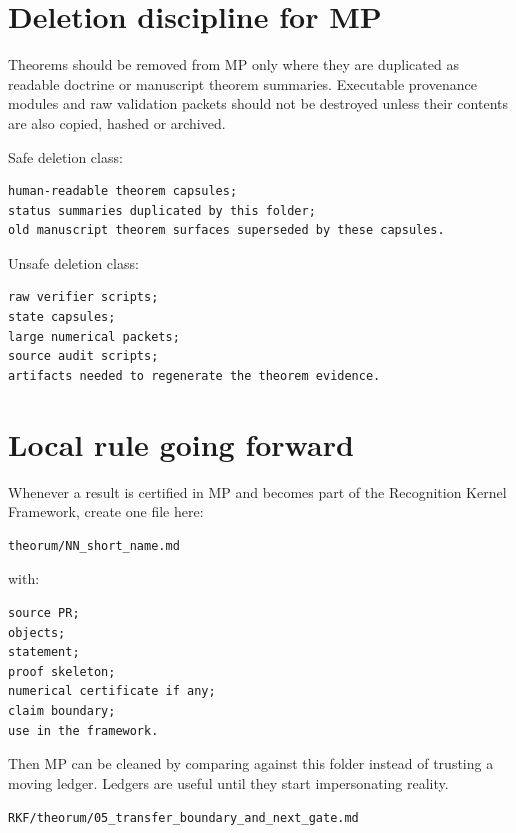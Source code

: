 \hypertarget{deletion-discipline-for-mp}{%
\section{Deletion discipline for MP}\label{deletion-discipline-for-mp}}

Theorems should be removed from MP only where they are duplicated as readable doctrine or manuscript theorem summaries. Executable provenance modules and raw validation packets should not be destroyed unless their contents are also copied, hashed or archived.

Safe deletion class:

\begin{verbatim}
human-readable theorem capsules;
status summaries duplicated by this folder;
old manuscript theorem surfaces superseded by these capsules.
\end{verbatim}

Unsafe deletion class:

\begin{verbatim}
raw verifier scripts;
state capsules;
large numerical packets;
source audit scripts;
artifacts needed to regenerate the theorem evidence.
\end{verbatim}

\hypertarget{local-rule-going-forward}{%
\section{Local rule going forward}\label{local-rule-going-forward}}

Whenever a result is certified in MP and becomes part of the Recognition Kernel Framework, create one file here:

\begin{verbatim}
theorum/NN_short_name.md
\end{verbatim}

with:

\begin{verbatim}
source PR;
objects;
statement;
proof skeleton;
numerical certificate if any;
claim boundary;
use in the framework.
\end{verbatim}

Then MP can be cleaned by comparing against this folder instead of trusting a moving ledger. Ledgers are useful until they start impersonating reality.

\begin{flushright}\small\texttt{RKF/theorum/05\_transfer\_boundary\_and\_next\_gate.md}\end{flushright}

